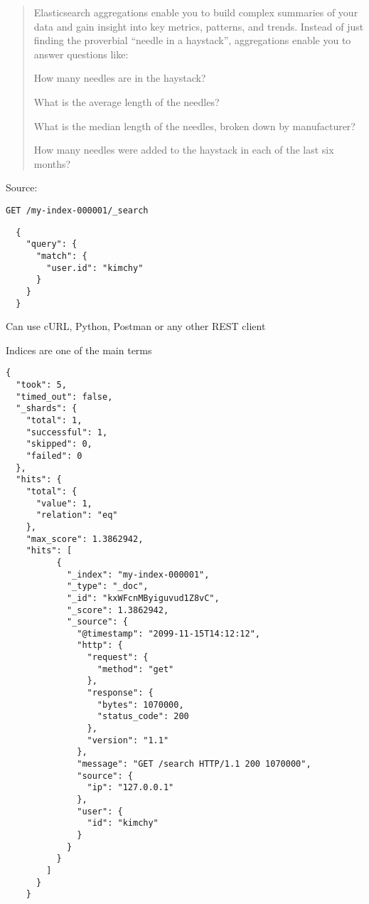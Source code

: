 \documentclass[Screen16to9,17pt]{foils}
\begin{document}


\begin{quote}
Elasticsearch aggregations enable you to build complex summaries of your data and gain insight into key metrics, patterns, and trends. Instead of just finding the proverbial “needle in a haystack”, aggregations enable you to answer questions like:

\begin{list2}
\item How many needles are in the haystack?
\item What is the average length of the needles?
\item What is the median length of the needles, broken down by manufacturer?
\item How many needles were added to the haystack in each of the last six months?
\end{list2}
\end{quote}
Source: 





\verb+GET /my-index-000001/_search+
\begin{verbatim}
  {
    "query": {
      "match": {
        "user.id": "kimchy"
      }
    }
  }
\end{verbatim}


\begin{list2}
\item Can use cURL, Python, Postman or any other REST client
\item Indices are one of the main terms
\end{list2}



\begin{verbatim}
{
  "took": 5,
  "timed_out": false,
  "_shards": {
    "total": 1,
    "successful": 1,
    "skipped": 0,
    "failed": 0
  },
  "hits": {
    "total": {
      "value": 1,
      "relation": "eq"
    },
    "max_score": 1.3862942,
    "hits": [
          {
            "_index": "my-index-000001",
            "_type": "_doc",
            "_id": "kxWFcnMByiguvud1Z8vC",
            "_score": 1.3862942,
            "_source": {
              "@timestamp": "2099-11-15T14:12:12",
              "http": {
                "request": {
                  "method": "get"
                },
                "response": {
                  "bytes": 1070000,
                  "status_code": 200
                },
                "version": "1.1"
              },
              "message": "GET /search HTTP/1.1 200 1070000",
              "source": {
                "ip": "127.0.0.1"
              },
              "user": {
                "id": "kimchy"
              }
            }
          }
        ]
      }
    }
\end{verbatim}
\end{document}

